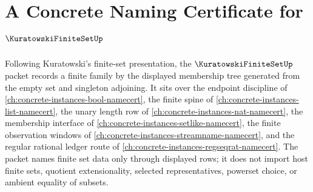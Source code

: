 \chapter{A Concrete Naming Certificate for $\KuratowskiFiniteSetUp$}
\label{ch:concrete-instances-kuratowski-finite-set-namecert}

Following Kuratowski's finite-set presentation, the $\KuratowskiFiniteSetUp$ packet records a finite family by the displayed membership tree generated from the empty set and singleton adjoining. It sits over the endpoint discipline of \autoref{ch:concrete-instances-bool-namecert}, the finite spine of \autoref{ch:concrete-instances-list-namecert}, the unary length row of \autoref{ch:concrete-instances-nat-namecert}, the membership interface of \autoref{ch:concrete-instances-setlike-namecert}, the finite observation windows of \autoref{ch:concrete-instances-streamname-namecert}, and the regular rational ledger route of \autoref{ch:concrete-instances-regseqrat-namecert}. The packet names finite set data only through displayed rows; it does not import host finite sets, quotient extensionality, selected representatives, powerset choice, or ambient equality of subsets.

